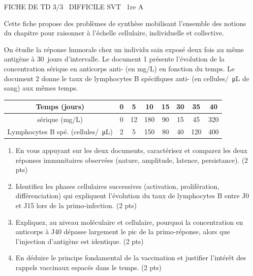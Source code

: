 \documentclass[11pt]{article}
\begin{document}
\begin{tcolorbox}[enhanced,colback=popink,colframe=popink,arc=10pt,boxrule=0pt,left=12pt,right=12pt,top=9pt,bottom=9pt]
{\color{white}\popxbold\small FICHE DE TD 3/3 \textbullet\ DIFFICILE \hfill SVT \textbullet\ 1re A\par}
\end{tcolorbox}
\vspace{4pt}
Cette fiche propose des problèmes de synthèse mobilisant l'ensemble des notions du chapitre pour raisonner à l'échelle cellulaire, individuelle et collective.

\begin{exercice}
On étudie la réponse humorale chez un individu sain exposé deux fois au même antigène  à \SI{30}{jours} d'intervalle. Le document 1 présente l'évolution de la concentration sérique en anticorps anti- (en mg/L) en fonction du temps. Le document 2 donne le taux de lymphocytes B spécifiques anti- (en cellules/\SI{}{\micro L} de sang) aux mêmes temps.

\begin{center}
\begin{tabular}{c|ccccccc}
\hline
Temps (jours) & 0 & 5 & 10 & 15 & 30 & 35 & 40 \\
\hline
[Ac] sérique (mg/L) & 0 & 12 & 180 & 90 & 15 & 45 & 320 \\
Lymphocytes B spé. (cellules/\SI{}{\micro L}) & 2 & 5 & 150 & 80 & 40 & 120 & 400 \\
\hline
\end{tabular}
\end{center}

\begin{enumerate}
    \item En vous appuyant sur les deux documents, caractérisez et comparez les deux réponses immunitaires observées (nature, amplitude, latence, persistance). \hfill (2 pts)
    \item Identifiez les phases cellulaires successives (activation, prolifération, différenciation) qui expliquent l'évolution du taux de lymphocytes B entre J0 et J15 lors de la primo-infection. \hfill (2 pts)
    \item Expliquez, au niveau moléculaire et cellulaire, pourquoi la concentration en anticorps à J40 dépasse largement le pic de la primo-réponse, alors que l'injection d'antigène est identique. \hfill (2 pts)
    \item En déduire le principe fondamental de la vaccination et justifier l'intérêt des rappels vaccinaux espacés dans le temps. \hfill (2 pts)
\end{enumerate}
\end{exercice}
\end{document}
